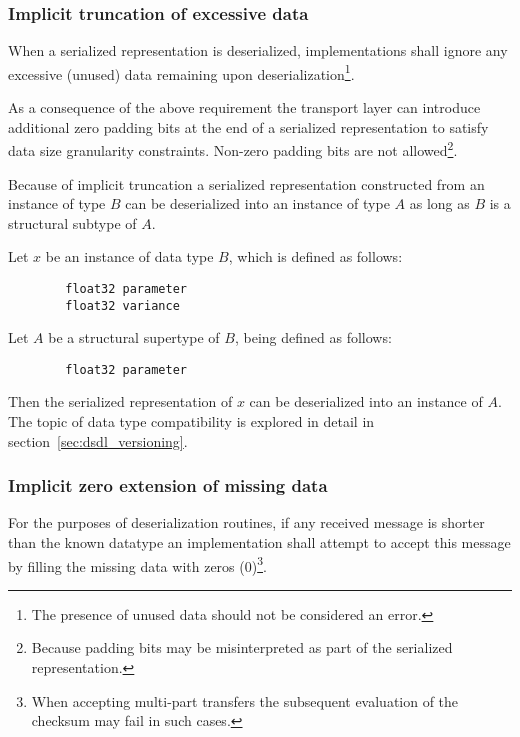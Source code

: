 \subsubsection{Implicit truncation of excessive data}

When a serialized representation is deserialized, implementations shall ignore
any excessive (unused) data remaining upon deserialization\footnote{%
    The presence of unused data should not be considered an error.
}.

As a consequence of the above requirement the transport layer can introduce
additional zero padding bits at the end of a serialized representation
to satisfy data size granularity constraints.
Non-zero padding bits are not allowed\footnote{%
    Because padding bits may be misinterpreted as part of the serialized representation.
}.

\begin{remark}
    Because of implicit truncation a serialized representation constructed from an instance of type $B$ can be
    deserialized into an instance of type $A$ as long as $B$ is a structural subtype of $A$.

    Let $x$ be an instance of data type $B$, which is defined as follows:

    \begin{verbatim}
        float32 parameter
        float32 variance
    \end{verbatim}

    Let $A$ be a structural supertype of $B$, being defined as follows:

    \begin{verbatim}
        float32 parameter
    \end{verbatim}

    Then the serialized representation of $x$ can be deserialized into an instance of $A$.
    The topic of data type compatibility is explored in detail in section~\ref{sec:dsdl_versioning}.
\end{remark}

\subsubsection{Implicit zero extension of missing data}

For the purposes of deserialization routines, if any received message is shorter than the known datatype an
implementation shall attempt to accept this message by filling the missing data with zeros (0)\footnote{%
    When accepting multi-part transfers the subsequent evaluation of the checksum may fail in such cases.
}.

